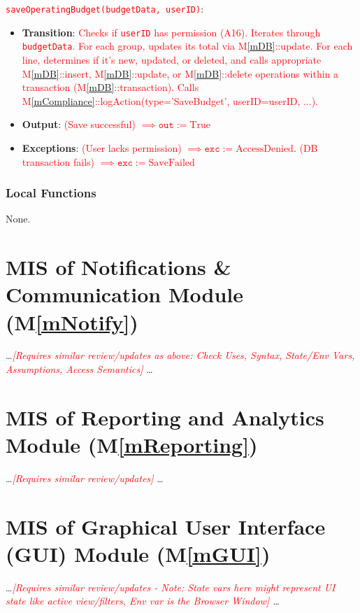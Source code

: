 \documentclass[12pt, titlepage]{article}
\providecommand{\mref}[1]{M\ref{#1}}
\begin{document}
\noindent \textcolor{red}{\texttt{saveOperatingBudget(budgetData, userID)}}:
\begin{itemize}
    \item \textbf{Transition}: \textcolor{red}{Checks if \texttt{userID} has permission (A16). Iterates through \texttt{budgetData}. For each group, updates its total via \mref{mDB}::update. For each line, determines if it's new, updated, or deleted, and calls appropriate \mref{mDB}::insert, \mref{mDB}::update, or \mref{mDB}::delete operations within a transaction (\mref{mDB}::transaction). Calls \mref{mCompliance}::logAction(type='SaveBudget', userID=userID, ...).}
    \item \textbf{Output}: \textcolor{red}{(Save successful) $\implies \texttt{out} := \text{True}$}
    \item \textbf{Exceptions}: \textcolor{red}{(User lacks permission) $\implies \texttt{exc} := \text{AccessDenied}$}. \textcolor{red}{(DB transaction fails) $\implies \texttt{exc} := \text{SaveFailed}$}
\end{itemize}

\subsubsection{Local Functions}
None.

\section{MIS of Notifications \& Communication Module (\mref{mNotify})}
\dots \textit{\textcolor{red}{[Requires similar review/updates as above: Check Uses, Syntax, State/Env Vars, Assumptions, Access Semantics]}} \dots

\section{MIS of Reporting and Analytics Module (\mref{mReporting})}
\dots \textit{\textcolor{red}{[Requires similar review/updates]}} \dots

\section{MIS of Graphical User Interface (GUI) Module (\mref{mGUI})}
\dots \textit{\textcolor{red}{[Requires similar review/updates - Note: State vars here might represent UI state like active view/filters, Env var is the Browser Window]} \dots}
\end{document}
